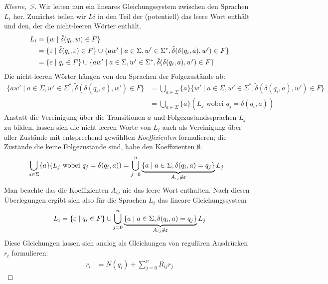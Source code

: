 {\begin{proof}[Kleene, \=>]
  Wir leiten nun ein lineares Gleichungssystem zwischen den Sprachen $L_i$ her.
  Zunächst teilen wir $Li$ in den Teil der (potentiell) das leere Wort enthält und den, der die nicht-leeren Wörter enthält.
  \begin{align*}
    L_i & =  \{ w \mid \tilde\delta(q_i,w)\in F \} \\
        & =  \{ \varepsilon \mid \tilde\delta(q_i, \varepsilon) \in F \} \cup \{a w' \mid a \in \Sigma, w' \in \Sigma^*, \tilde\delta(\delta(q_i, a), w') \in F\} \\
        & =  \{ \varepsilon \mid q_i \in F \} \cup \{a w' \mid a \in \Sigma, w' \in \Sigma^*, \tilde\delta(\delta(q_i, a), w') \in F\}
    \end{align*}
    Die nicht-leeren Wörter hängen von den Sprachen der Folgezustände ab:
    \begin{align*}
      \{a w' \mid a \in \Sigma, w' \in \Sigma^*, \tilde\delta(\delta(q_i, a), w') \in F\} & =
         \bigcup_{a \in \Sigma} \{a\} \{w' \mid a \in \Sigma, w' \in \Sigma^*, \tilde\delta(\delta(q_i, a), w') \in F\}
      \\
      & = \bigcup_{a \in \Sigma} \{a\} (L_j \text{ wobei  $q_j = \delta(q_i, a)$}) 
    \end{align*}
    Anstatt die Vereinigung über die Transitionen $a$ und Folgezustandssprachen $L_j$ zu bilden, lassen sich die nicht-leeren Worte von $L_i$ auch als Vereinigung über aller Zustände mit entsprechend gewählten \emph{Koeffizienten} formulieren; die Zustände die keine Folgezustände sind, habe den Koeffizienten $\emptyset$.
    \begin{align*}
      \bigcup_{a \in \Sigma} \{a\} (L_j \text{ wobei  $q_j = \delta(q_i, a)$}) & = \bigcup_{j = 0}^{n} \underbrace{\{a \mid a \in \Sigma, \delta(q_i, a) = q_j\}}_{A_{ij} \not \ni \varepsilon} L_j
    \end{align*}
    Man beachte das die Koeffizienten $A_{ij}$ nie das leere Wort enthalten.
    Nach diesen Überlegungen ergibt sich also für die Sprachen $L_i$ das lineare Gleichungssystem
    \begin{displaymath}
      L_i = \{ \varepsilon \mid q_i \in F \} \cup \bigcup_{j = 0}^{n} \underbrace{\{a \mid a \in \Sigma, \delta(q_i, a) = q_j\}}_{A_{ij} \not \ni \varepsilon} L_j
    \end{displaymath}
    Diese Gleichungen lassen sich analog als Gleichungen von regulären Ausdrücken $r_i$ formulieren:
    \begin{align*}
      r_i &= N(q_i) + \sum_{j = 0}^n R_{ij} r_j
    \end{align*}

\end{proof}}
